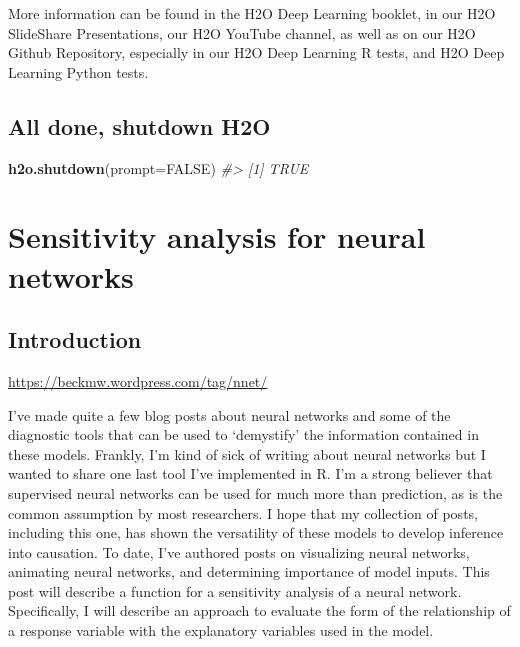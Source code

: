 \documentclass[]{book}
\newenvironment{Shaded}{\begin{snugshade}}{\end{snugshade}}
\newcommand{\CommentTok}[1]{\textcolor[rgb]{0.56,0.35,0.01}{\textit{#1}}}
\newcommand{\DataTypeTok}[1]{\textcolor[rgb]{0.13,0.29,0.53}{#1}}
\newcommand{\KeywordTok}[1]{\textcolor[rgb]{0.13,0.29,0.53}{\textbf{#1}}}
\newcommand{\NormalTok}[1]{#1}
\newcommand{\OtherTok}[1]{\textcolor[rgb]{0.56,0.35,0.01}{#1}}
\begin{document}
More information can be found in the H2O Deep Learning booklet, in our H2O SlideShare Presentations, our H2O YouTube channel, as well as on our H2O Github Repository, especially in our H2O Deep Learning R tests, and H2O Deep Learning Python tests.

\hypertarget{all-done-shutdown-h2o}{%
\section{All done, shutdown H2O}\label{all-done-shutdown-h2o}}

\begin{Shaded}
\begin{Highlighting}[]
\KeywordTok{h2o.shutdown}\NormalTok{(}\DataTypeTok{prompt=}\OtherTok{FALSE}\NormalTok{)}
\CommentTok{#> [1] TRUE}
\end{Highlighting}
\end{Shaded}

\hypertarget{sensitivity-analysis-for-neural-networks}{%
\chapter{Sensitivity analysis for neural networks}\label{sensitivity-analysis-for-neural-networks}}

\hypertarget{introduction-4}{%
\section{Introduction}\label{introduction-4}}

\url{https://beckmw.wordpress.com/tag/nnet/}

I've made quite a few blog posts about neural networks and some of the diagnostic tools that can be used to `demystify' the information contained in these models. Frankly, I'm kind of sick of writing about neural networks but I wanted to share one last tool I've implemented in R. I'm a strong believer that supervised neural networks can be used for much more than prediction, as is the common assumption by most researchers. I hope that my collection of posts, including this one, has shown the versatility of these models to develop inference into causation. To date, I've authored posts on visualizing neural networks, animating neural networks, and determining importance of model inputs. This post will describe a function for a sensitivity analysis of a neural network. Specifically, I will describe an approach to evaluate the form of the relationship of a response variable with the explanatory variables used in the model.
\end{document}

